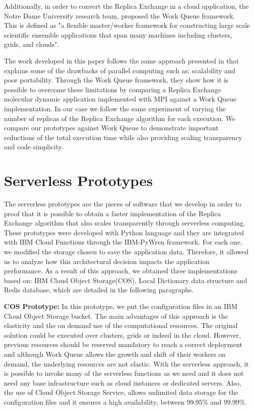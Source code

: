 \documentclass[sigplan, screen]{acmart}
\begin{document}
Additionally, in order to convert the Replica Exchange in a cloud application, the Notre Dame University research team, proposed the Work Queue framework\cite{wqPython}. This is defined as "a flexible master/worker framework for constructing large scale scientific ensemble applications that span many machines including  clusters, grids, and clouds".

The work developed in this paper follows the same approach presented in \cite{cloudwq} that explains some of the drawbacks of parallel computing such as; scalability and poor portability. Through the Work Queue framework\cite{wqFolding}, they show how it is possible to overcome these limitations by comparing a Replica Exchange molecular dynamic application implemented with MPI against a  Work Queue implementation. In our case we follow the same experiment of varying the number of replicas of the Replica Exchange algorithm for each execution.  We compare our prototypes against Work Queue  to demonstrate important reductions of the  total execution time while also providing scaling transparency and code simplicity.

\section{Serverless Prototypes}
The serverless prototypes are the pieces of software that we develop in order to proof that it is possible to obtain a faster implementation of the Replica Exchange algorithm that also scales transparently through serverless computing. These prototypes were developed with Python language and they are integrated with IBM Cloud Functions through the IBM-PyWren framework\cite{ibmPyWren}. For each one, we modified the storage chosen to save the application data. Therefore, it allowed us to analyze how this architectural decision impacts the application performance. As a result of this approach, we obtained three implementations based on: IBM Cloud Object Storage(COS), Local Dictionary data structure and Redis database, which are detailed in the following paragraphs.

\vspace{2mm}
\noindent
\textbf{COS  Prototype:}
 In this prototype, we put the configuration files in an IBM Cloud Object Storage bucket. The main advantages of this approach is the elasticity and the on demand use of the computational resources. The original solution could be executed over clusters, grids or indeed in the cloud. However, previous resources should be reserved mandatory to reach a correct deployment and although Work Queue allows the growth and shift of their workers on demand, the underlying resources are not elastic. With the serverless approach, it is possible to invoke many of the serverless functions as we need and it does not need any base infrastructure such as cloud instances or dedicated servers. Also, the use of Cloud Object Storage Service, allows unlimited data storage for the configuration files and it ensures a high availability, between 99.95\% and  99.99\%.
\end{document}
